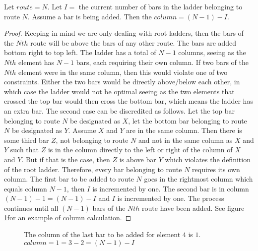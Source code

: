 \begin{lemma}
  Let $route=N$. Let $I=$ the current number of bars in the ladder belonging to route $N$. 
  Assume a bar is being added. Then the $column=(N-1)-I$.
\end{lemma}
\begin{proof}
  Keeping in mind we are only dealing with root ladders, then the bars of the $Nth$ route will be above the bars of 
  any other route. The bars are added bottom right to top left. The ladder has a total of $N-1$ columns, seeing as 
  the $Nth$ element has $N-1$ bars, each requiring their own column. If two bars of the $Nth$ element were 
  in the same column, then this would violate one of two constraints. Either the two bars would be directly 
  above/below each other, in which case the ladder would not be optimal seeing as the two elements that crossed the 
  top bar would then cross the bottom bar, which means the ladder has an extra bar. The second case can be discredited as 
  follows. Let the top bar belonging to route $N$ be designated as $X$, let the bottom bar belonging to route $N$ be 
  designated as $Y$. Assume $X$ and $Y$ are in the same column.
  Then there is some third bar $Z$, not belonging to route $N$ and not in the same column 
  as $X$ and $Y$ such that $Z$ is in the column directly to the left or right of the column of $X$ and $Y$. But if that 
  is the case, then $Z$ is above bar $Y$ which violates the definition of the root ladder. Therefore, every bar 
  belonging to route $N$ requires its own column. The first bar to be added to route $N$ goes in the rightmost column which 
  equals column $N-1$, then $I$ is incremented by one. The second bar is in column $(N-1)-1=(N-1)-I$ and $I$ is incremented 
  by one. The process continues until all $(N-1)$ bars of the $Nth$ route have been added. See figure \ref{fig:SJTcase2}for an example 
  of column calculation.
\end{proof}

\begin{figure}[!htp]
  \begin{center}
  \end{center}
  \caption{The column of the last bar to be added for element $4$ is $1$. $column=1=3-2=(N-1)-I$}
  \label{fig:SJTcase2}
\end{figure}



